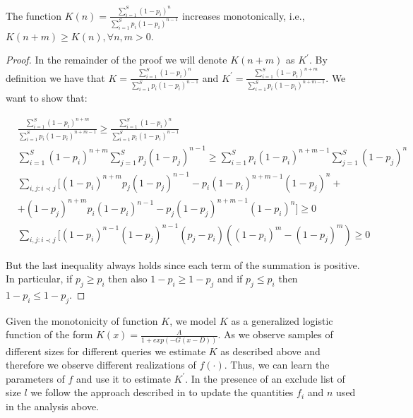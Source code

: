 \begin{lemma}
\label{monotonicity}
The function $K(n) = \frac{\sum_{i=1}^S (1-p_i)^n}{\sum_{i=1}^S p_i(1-p_i)^{n-1}}$ increases monotonically, i.e., $K(n+m) \geq K(n), \forall n,m > 0$.
\end{lemma}
\iftr
\begin{proof}
In the remainder of the proof we will denote $K(n+m)$ as $K^{\prime}$. By definition we have that $K = \frac{\sum_{i=1}^S (1-p_i)^n}{\sum_{i=1}^S p_i(1-p_i)^{n-1}}$ and $K^{\prime} = \frac{\sum_{i=1}^S (1-p_i)^{n+m}}{\sum_{i=1}^S p_i(1-p_i)^{n+m-1}}$. We want to show that:

{\small
\begin{align}
&\frac{\sum_{i=1}^S (1-p_i)^{n+m}}{\sum_{i=1}^S p_i(1-p_i)^{n+m-1}} \geq \frac{\sum_{i=1}^S (1-p_i)^n}{\sum_{i=1}^S p_i(1-p_i)^{n-1}} \nonumber \\
&\sum_{i=1}^S (1-p_i)^{n+m}\sum_{j=1}^S p_j(1-p_j)^{n-1} \geq \sum_{i=1}^S p_i(1-p_i)^{n+m-1}\sum_{j=1}^S (1-p_j)^n\nonumber \\
&\sum_{i,j:i\prec j}[(1-p_i)^{n+m}p_j(1-p_j)^{n-1} - p_i(1-p_i)^{n+m-1}(1-p_j)^n + \nonumber \\
& + (1-p_j)^{n+m}p_i(1-p_i)^{n-1} - p_j(1-p_j)^{n+m-1}(1-p_i)^n] \geq 0 \nonumber \\
&\sum_{i,j:i\prec j}[(1-p_i)^{n-1}(1-p_j)^{n-1}(p_j-p_i)((1-p_i)^{m} - (1-p_j)^{m}) \geq 0
\end{align}}

But the last inequality always holds since each term of the summation is positive. In particular, if $p_j \geq p_i$ then
also $1-p_i \geq 1-p_j$ and if $p_j \leq p_i$ then $1-p_i \leq 1-p_j$.
\end{proof}
\fi
Given the monotonicity of function $K$, we model $K$ as a generalized logistic function of the form $K(x) = \frac{A}{1+exp(-G(x-D))}$. As we observe samples of different sizes for different queries we estimate $K$ as described above and therefore we observe different realizations of $f(\cdot)$. Thus, we can learn the parameters of $f$ and use it to estimate $K^{\prime}$. In the presence of an exclude list of size $l$ we follow the approach described in  to update the quantities $f_i$ and $n$ used in the analysis above. 

